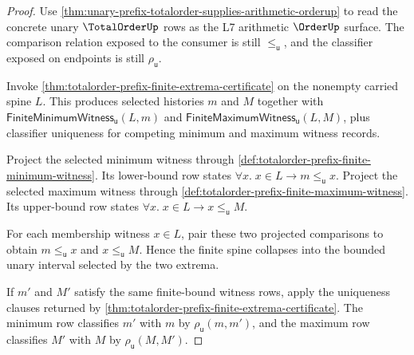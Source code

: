 \begin{proof}
Use
\autoref{thm:unary-prefix-totalorder-supplies-arithmetic-orderup} to read the
concrete unary $\TotalOrderUp$ rows as the L7 arithmetic $\OrderUp$ surface.
The comparison relation exposed to the consumer is still
$\le_{\mathsf{u}}$, and the classifier exposed on endpoints is still
$\rho_{\mathsf{u}}$.

Invoke \autoref{thm:totalorder-prefix-finite-extrema-certificate} on the
nonempty carried spine $L$. This produces selected histories $m$ and $M$
together with
$\mathsf{FiniteMinimumWitness}_{\mathsf{u}}(L,m)$ and
$\mathsf{FiniteMaximumWitness}_{\mathsf{u}}(L,M)$, plus classifier uniqueness
for competing minimum and maximum witness records.

Project the selected minimum witness through
\autoref{def:totalorder-prefix-finite-minimum-witness}. Its lower-bound row
states $\forall x.\; x\in L\to m\le_{\mathsf{u}}x$. Project the selected
maximum witness through
\autoref{def:totalorder-prefix-finite-maximum-witness}. Its upper-bound row
states $\forall x.\; x\in L\to x\le_{\mathsf{u}}M$.

For each membership witness $x\in L$, pair these two projected comparisons to
obtain $m\le_{\mathsf{u}}x$ and $x\le_{\mathsf{u}}M$. Hence the finite spine
collapses into the bounded unary interval selected by the two extrema.

If $m'$ and $M'$ satisfy the same finite-bound witness rows, apply the
uniqueness clauses returned by
\autoref{thm:totalorder-prefix-finite-extrema-certificate}. The minimum row
classifies $m'$ with $m$ by $\rho_{\mathsf{u}}(m,m')$, and the maximum row
classifies $M'$ with $M$ by $\rho_{\mathsf{u}}(M,M')$.
\end{proof}

